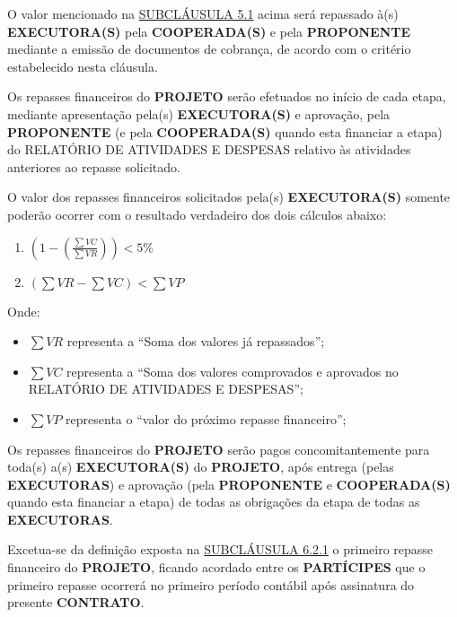 
\xx O valor mencionado na \hyperlink{5.1}{SUBCLÁUSULA 5.1} acima será repassado à(s) \textbf{EXECUTORA(S)} pela \textbf{COOPERADA(S)} e pela \textbf{PROPONENTE} mediante a emissão de documentos de cobrança, de acordo com o critério estabelecido nesta cláusula.

\xx Os repasses financeiros do \textbf{PROJETO} serão efetuados no início de cada etapa, mediante apresentação pela(s) \textbf{EXECUTORA(S)} e aprovação, pela \textbf{PROPONENTE} (e pela \textbf{COOPERADA(S)} quando esta financiar a etapa) do RELATÓRIO DE ATIVIDADES E DESPESAS relativo às atividades anteriores ao repasse solicitado.

\xxx O valor dos repasses financeiros solicitados pela(s) \textbf{EXECUTORA(S)} somente poderão ocorrer com o resultado verdadeiro dos dois cálculos abaixo:

\newcommand{\dsum}{\displaystyle\sum}

\begin{enumerate}[label=\alph*), leftmargin=3cm]
    \everymath{\displaystyle}
    \item $ \left( 1- \left(  \frac{\dsum VC }{\dsum VR}  \right) \right) < 5\% $
    \item $ \left(\dsum VR- \dsum VC \right) < \dsum VP $

\end{enumerate}
Onde:

\begin{itemize}
    \item $\dsum VR$ representa a “Soma dos valores já repassados”;
    \item $\dsum VC$ representa a “Soma dos valores comprovados e aprovados no RELATÓRIO DE ATIVIDADES E DESPESAS”;
    \item $\dsum VP$ representa o “valor do próximo repasse financeiro”;

\end{itemize}

\xxx Os repasses financeiros do \textbf{PROJETO} serão pagos concomitantemente para toda(s) a(s) \textbf{EXECUTORA(S)} do \textbf{PROJETO}, após entrega (pelas \textbf{EXECUTORAS}) e aprovação (pela \textbf{PROPONENTE} e \textbf{COOPERADA(S)} quando esta financiar a etapa) de todas as obrigações da etapa de todas as \textbf{EXECUTORAS}.

\xxx Excetua-se da definição exposta na \hyperlink{6.2.1}{SUBCLÁUSULA 6.2.1} o primeiro repasse financeiro do \textbf{PROJETO}, ficando acordado entre os \textbf{PARTÍCIPES} que o primeiro repasse ocorrerá no primeiro período contábil após assinatura do presente \textbf{CONTRATO}.

